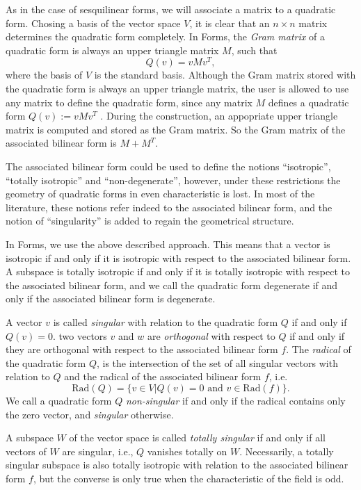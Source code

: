 \documentclass[a4paper,11pt]{report}
\begin{document}
{{ As in the case of sesquilinear forms, we will associate a matrix to a
quadratic form. Chosing a basis of the vector space $V$, it is clear that an $n \times n$ matrix determines the quadratic form completely. In \textsf{Forms}, the \emph{Gram matrix} of a quadratic form is always an upper triangle matrix $M$, such that 
\[Q(v) = vMv^T,\]
  where the basis of $V$ is the standard basis. Although the Gram matrix stored with the quadratic form
is always an upper triangle matrix, the user is allowed to use any matrix to
define the quadratic form, since any matrix $M$ defines a quadratic form  $Q(v) := vMv^T$ . During the construction, an appopriate upper triangle matrix is computed and
stored as the Gram matrix. So the Gram matrix of the associated bilinear form
is  $M+M^T$.  

 The associated bilinear form could be used to define the notions
``isotropic'', ``totally isotropic'' and ``non-degenerate'', however, under
these restrictions the geometry of quadratic forms in even characteristic is
lost. In most of the literature, these notions refer indeed to the associated
bilinear form, and the notion of ``singularity'' is added to regain the
geometrical structure. 

In \textsf{Forms}, we use the above described approach. This means that a vector is isotropic
if and only if it is isotropic with respect to the associated bilinear form. A
subspace is totally isotropic if and only if it is totally isotropic with
respect to the associated bilinear form, and we call the quadratic form
degenerate if and only if the associated bilinear form is degenerate. 

 A vector $v$ is called \emph{singular} with relation to the quadratic form $Q$ if and only if $Q(v)=0$. two vectors $v$ and $w$ are \emph{orthogonal} with respect to $Q$ if and only if they are orthogonal with respect to the associated bilinear
form $f$. The \emph{radical} of the quadratic form $Q$, is the intersection of the set of all singular vectors with relation to $Q$ and the radical of the associated bilinear form $f$, i.e.  
\[\mathrm{Rad}(Q) = \{v \in V | Q(v) = 0\,\, \mathrm{and}\,\, v \in \mathrm{Rad}(f)\}.\]
   We call a quadratic form $Q$ \emph{non-singular} if and only if the radical contains only the zero vector, and \emph{singular} otherwise. 

 A subspace $W$ of the vector space is called \emph{totally singular} if and only if all vectors of $W$ are singular, i.e., $Q$ vanishes totally on $W$. Necessarily, a totally singular subspace is also totally isotropic with
relation to the associated bilinear form $f$, but the converse is only true when the characteristic of the field is odd. 

}}
\end{document}
